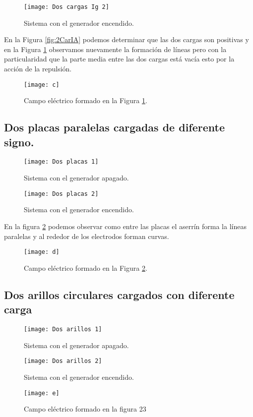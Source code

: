 \documentclass[14pt]{article}
\begin{document}
\begin{figure}[h!]
	\centering
	\texttt{[image: Dos cargas Ig 2]}
	\caption{Sistema con el generador encendido.}
	\label{fig:2CarI}
\end{figure}

En la Figura \ref{fig:2CarIA} podemos determinar que las dos cargas son positivas y en la Figura \ref{fig:2CarI} observamos nuevamente la formación de líneas pero con la particularidad que la parte media entre las dos cargas está vacía esto por la acción de la repulsión.

\begin{figure}
	\centering
	\texttt{[image: c]}
	\caption{Campo eléctrico formado en la Figura \ref{fig:2CarI}.}
\end{figure}

\subsection{Dos placas paralelas cargadas de diferente signo.}

\begin{figure}[h!]
	\centering
	\texttt{[image: Dos placas 1]}
	\caption{Sistema con el generador apagado.}
\end{figure}

\begin{figure}[h!]
	\centering
	\texttt{[image: Dos placas 2]}
	\caption{Sistema con el generador encendido.}
	\label{fig:DosPlacas}
\end{figure}

En la figura \ref{fig:DosPlacas} podemos observar como entre las placas el aserrín forma la líneas paralelas y al rededor de los electrodos forman curvas.

\begin{figure}[h!]
	\centering
	\texttt{[image: d]}
	\caption{Campo eléctrico formado en la Figura \ref{fig:DosPlacas}.}
\end{figure}


\subsection{Dos arillos circulares cargados con diferente carga}

\begin{figure}[h!]
	\centering
	\texttt{[image: Dos arillos 1]}
	\caption{Sistema con el generador apagado.}
	\texttt{[image: Dos arillos 2]}
	\caption{Sistema con el generador encendido.}
	\texttt{[image: e]}
	\caption{Campo eléctrico formado en la figura 23}
\end{figure}
\end{document}

